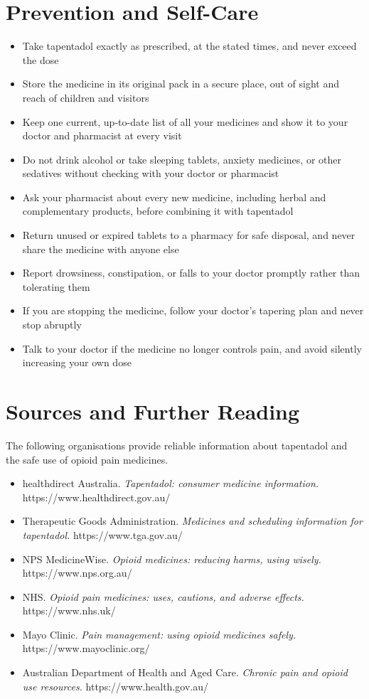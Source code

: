 \section*{Prevention and Self-Care}
\begin{itemize}
    \item Take tapentadol exactly as prescribed, at the stated times, and never exceed the dose
    \item Store the medicine in its original pack in a secure place, out of sight and reach of children and visitors
    \item Keep one current, up-to-date list of all your medicines and show it to your doctor and pharmacist at every visit
    \item Do not drink alcohol or take sleeping tablets, anxiety medicines, or other sedatives without checking with your doctor or pharmacist
    \item Ask your pharmacist about every new medicine, including herbal and complementary products, before combining it with tapentadol
    \item Return unused or expired tablets to a pharmacy for safe disposal, and never share the medicine with anyone else
    \item Report drowsiness, constipation, or falls to your doctor promptly rather than tolerating them
    \item If you are stopping the medicine, follow your doctor's tapering plan and never stop abruptly
    \item Talk to your doctor if the medicine no longer controls pain, and avoid silently increasing your own dose
\end{itemize}

\section*{Sources and Further Reading}
The following organisations provide reliable information about tapentadol and the safe use of opioid pain medicines.

\begin{itemize}
    \item healthdirect Australia. \textit{Tapentadol: consumer medicine information.} https://www.healthdirect.gov.au/
    \item Therapeutic Goods Administration. \textit{Medicines and scheduling information for tapentadol.} https://www.tga.gov.au/
    \item NPS MedicineWise. \textit{Opioid medicines: reducing harms, using wisely.} https://www.nps.org.au/
    \item NHS. \textit{Opioid pain medicines: uses, cautions, and adverse effects.} https://www.nhs.uk/
    \item Mayo Clinic. \textit{Pain management: using opioid medicines safely.} https://www.mayoclinic.org/
    \item Australian Department of Health and Aged Care. \textit{Chronic pain and opioid use resources.} https://www.health.gov.au/
\end{itemize}

\clearpage
